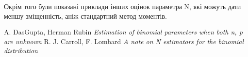 \documentclass{article}
\begin{document}
Окрім того були показані приклади інших оцінок параметра N, які можуть дати меншу зміщенність, аніж
стандартний метод моментів.
\begin{thebibliography}{9}
        A. DasGupta, Herman Rubin \textit{Estimation of binomial parameters when both n, p are
        unknown}
        R. J. Carroll, F. Lombard \textit{A note on N estimators for the binomial distribution}
\end{thebibliography}
\end{document}
